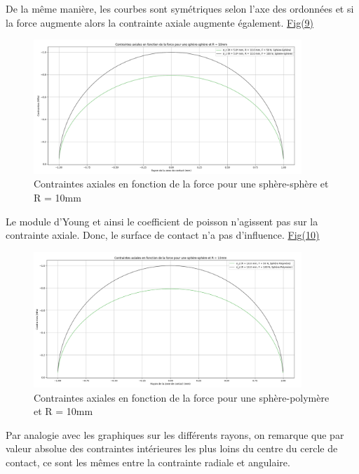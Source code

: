 \documentclass[a4paper,12pt]{article}
\begin{document}
\clearpage
De la même manière, les courbes sont symétriques selon l'axe des ordonnées et si la force augmente alors la contrainte axiale augmente également. \hyperref[fig:mon_image9]{Fig(9)}
\begin{figure}[H] %
	\centering
	\includegraphics[width=0.9\textwidth]{ax3.png} %
	\caption{Contraintes axiales en fonction de la force pour une sphère-sphère et R = 10mm} %
	\label{fig:mon_image9} %
\end{figure}
Le module d'Young et ainsi le coefficient de poisson n'agissent pas sur la contrainte axiale. Donc, le surface de contact n'a pas d'influence. \hyperref[fig:mon_image10]{Fig(10)}
\begin{figure}[H] %
	\centering
	\includegraphics[width=0.9\textwidth]{ax4.png} %
	\caption{Contraintes axiales en fonction de la force pour une sphère-polymère et R = 10mm} %
	\label{fig:mon_image10} %
\end{figure}
\clearpage
Par analogie avec les graphiques sur les différents rayons, on remarque que par valeur absolue des contraintes intérieures les plus loins du centre du cercle de contact, ce sont les mêmes entre la contrainte radiale et angulaire.\\
\end{document}

